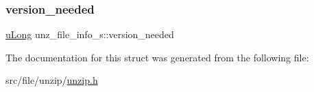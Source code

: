 \mbox{\label{structunz__file__info__s_a1578aca2bb7fed658f9f94c78d00288e}} 
\subsubsection{\texorpdfstring{version\+\_\+needed}{version\_needed}}
{\footnotesize\ttfamily \hyperlink{ioapi_8h_a50e9e9d5c30e481de822ad68fe537986}{u\+Long} unz\+\_\+file\+\_\+info\+\_\+s\+::version\+\_\+needed}



The documentation for this struct was generated from the following file\+:\begin{DoxyCompactItemize}
\item 
src/file/unzip/\hyperlink{unzip_8h}{unzip.\+h}\end{DoxyCompactItemize}
